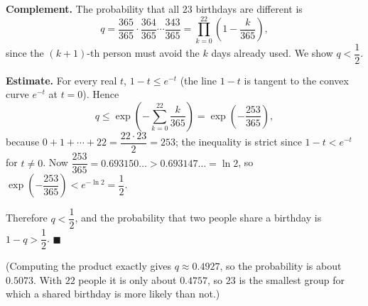 \textbf{Complement.} The probability that all $23$ birthdays are different is
\[
q=\dfrac{365}{365}\cdot\dfrac{364}{365}\cdots\dfrac{343}{365}=\prod_{k=0}^{22}\left(1-\dfrac{k}{365}\right),
\]
since the $(k+1)$-th person must avoid the $k$ days already used. We show $q<\dfrac{1}{2}$.

\textbf{Estimate.} For every real $t$, $1-t\le e^{-t}$ (the line $1-t$ is tangent to the convex curve $e^{-t}$ at $t=0$). Hence
\[
q\le\exp\left(-\sum_{k=0}^{22}\dfrac{k}{365}\right)=\exp\left(-\dfrac{253}{365}\right),
\]
because $0+1+\cdots+22=\dfrac{22\cdot23}{2}=253$; the inequality is strict since $1-t<e^{-t}$ for $t\ne0$. Now $\dfrac{253}{365}=0.693150\ldots>0.693147\ldots=\ln2$, so $\exp\left(-\dfrac{253}{365}\right)<e^{-\ln2}=\dfrac{1}{2}$.

Therefore $q<\dfrac{1}{2}$, and the probability that two people share a birthday is $1-q>\dfrac{1}{2}$. $\blacksquare$

(Computing the product exactly gives $q\approx0.4927$, so the probability is about $0.5073$. With $22$ people it is only about $0.4757$, so $23$ is the smallest group for which a shared birthday is more likely than not.)
